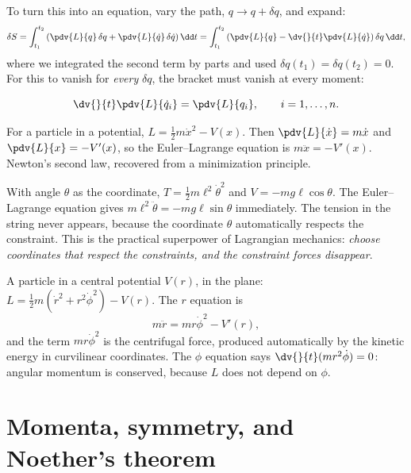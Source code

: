 To turn this into an equation, vary the path, $q\to q + \delta q$, and expand:
\[
  \delta S = \int_{t_1}^{t_2}\left(\pdv{L}{q}\,\delta q + \pdv{L}{\dot q}\,\delta\dot q\right)\dd t
  = \int_{t_1}^{t_2}\left(\pdv{L}{q} - \dv{}{t}\pdv{L}{\dot q}\right)\delta q\,\dd t ,
\]
where we integrated the second term by parts and used $\delta q(t_1) = \delta q(t_2) = 0$. For this to vanish for \emph{every} $\delta q$, the bracket must vanish at every moment:

\begin{law}
\[
  \dv{}{t}\pdv{L}{\dot q_i} = \pdv{L}{q_i}, \qquad i = 1,\dots,n.
\]
\end{law}

\begin{example}
For a particle in a potential, $L = \tfrac12 m\dot x^2 - V(x)$. Then $\pdv{L}{\dot x} = m\dot x$ and $\pdv{L}{x} = -V'(x)$, so the Euler--Lagrange equation is $m\ddot x = -V'(x)$. Newton's second law, recovered from a minimization principle.
\end{example}

\begin{example}
With angle $\theta$ as the coordinate, $T=\tfrac12 m\ell^2\dot\theta^2$ and $V = -mg\ell\cos\theta$. The Euler--Lagrange equation gives $m\ell^2\ddot\theta = -mg\ell\sin\theta$ immediately. The tension in the string never appears, because the coordinate $\theta$ automatically respects the constraint. This is the practical superpower of Lagrangian mechanics: \emph{choose coordinates that respect the constraints, and the constraint forces disappear}.
\end{example}

\begin{example}
A particle in a central potential $V(r)$, in the plane: $L = \tfrac12 m(\dot r^2 + r^2\dot\phi^2) - V(r)$. The $r$ equation is
\[
  m\ddot r = mr\dot\phi^2 - V'(r),
\]
and the term $mr\dot\phi^2$ is the centrifugal force, produced automatically by the kinetic energy in curvilinear coordinates. The $\phi$ equation says $\dv{}{t}(mr^2\dot\phi) = 0$: angular momentum is conserved, because $L$ does not depend on $\phi$.
\end{example}

\section{Momenta, symmetry, and Noether's theorem}


